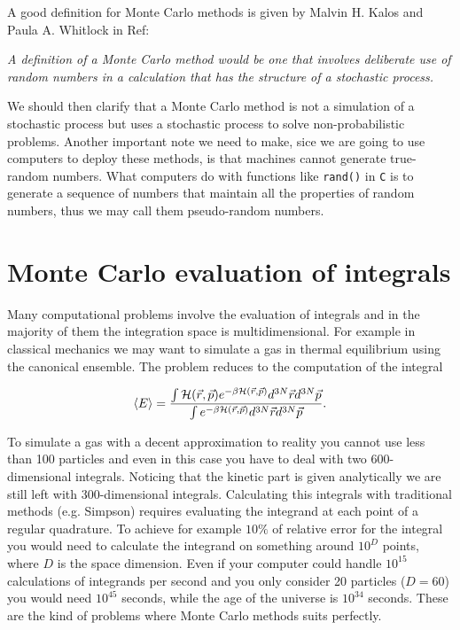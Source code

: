 A good definition for Monte Carlo methods is given by Malvin H. Kalos and Paula A. Whitlock in Ref\cite{MonteCarloMethods}:
\begin{center}
  \quote\textit{A definition of a Monte Carlo method would be one that involves deliberate use of random numbers in a calculation that has the structure of a stochastic process.}
\end{center}

We should then clarify that a Monte Carlo method is not a simulation of a stochastic process but uses a stochastic process to solve non-probabilistic problems.
Another important note we need to make, sice we are going to use computers to deploy these methods, is that machines cannot generate true-random numbers. What computers do with functions like \texttt{rand()} in \texttt{C} is to generate a sequence of numbers that maintain all the properties of random numbers, thus we may call them pseudo-random numbers.

\section{Monte Carlo evaluation of integrals}

Many computational problems involve the evaluation of integrals and in the majority of them the integration space is multidimensional.
For example in classical mechanics we may want to simulate a gas in thermal equilibrium using the canonical ensemble.
The problem reduces to the computation of the integral

\begin{equation}
  \langle  E  \rangle = \dfrac{ \int \mathcal{H}(\vec{r},\vec{p})e^{-\beta\mathcal{H}(\vec{r},\vec{p})} d^{3N}\vec{r}d^{3N}\vec{p} }{ \int e^{-\beta\mathcal{H}(\vec{r},\vec{p})} d^{3N}\vec{r}d^{3N}\vec{p} }.
  \label{canonical}
\end{equation}

To simulate a gas with a decent approximation to reality you cannot use less than 100 particles and even in this case you have to deal with two 600-dimensional integrals.
Noticing that the kinetic part is given analytically we are still left with 300-dimensional integrals.
Calculating this integrals with traditional methods (e.g. Simpson) requires evaluating the integrand at each point of a regular quadrature.
To achieve for example $10\%$ of relative error for the integral you would need to calculate the integrand on something around $10^D$ points, where $D$ is the space dimension.
Even if your computer could handle $10^{15}$ calculations of integrands per second and you only consider 20 particles ($D=60$) you would need $10^{45}$ seconds, while the age of the universe is $10^{34}$ seconds.
These are the kind of problems where Monte Carlo methods suits perfectly.

